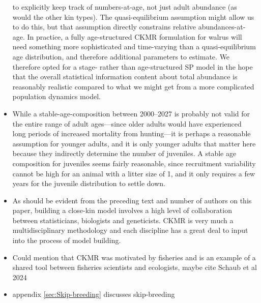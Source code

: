 \begin{itemize}
to explicitly keep track of numbers-at-age, not just adult abundance
(as would the other kin types). The quasi-equilibrium assumption might
allow us to do this, but that assumption directly constrains relative
abundances-at-age. In practice, a fully age-structured CKMR formulation
for walrus will need something more sophisticated and time-varying
than a quasi-equilibrium age distribution, and therefore additional
parameters to estimate. We therefore opted for a stage- rather than
age-structured SP model in the hope that the overall statistical information
content about total abundance is reasonably realistic compared to
what we might get from a more complicated population dynamics model.
\item While a stable-age-composition between 2000–2027 is probably not valid
for the entire range of adult ages—since older adults would have experienced
long periods of increased mortality from hunting—it is perhaps a reasonable
assumption for younger adults, and it is only younger adults that
matter here because they indirectly determine the number of juveniles.
A stable age composition for juveniles seems fairly reasonable, since
\textquotedbl recruitment variability\textquotedbl{} cannot be high
for an animal with a litter size of 1, and it only requires a few
years for the juvenile distribution to settle down.
%
\item As should be evident from the preceding text and number of authors
on this paper, building a close-kin model involves a high level of
collaboration between statisticians, biologists and geneticists. CKMR
is very much a multidisciplinary methodology and each discipline has
a great deal to input into the process of model building.
\item Could mention that CKMR was motivated by fisheries and is an example
of a shared tool between fisheries scientists and ecologists, maybe
cite Schaub et al 2024
\item appendix \eqref{sec:Skip-breeding} discusses skip-breeding%
\end{itemize}

